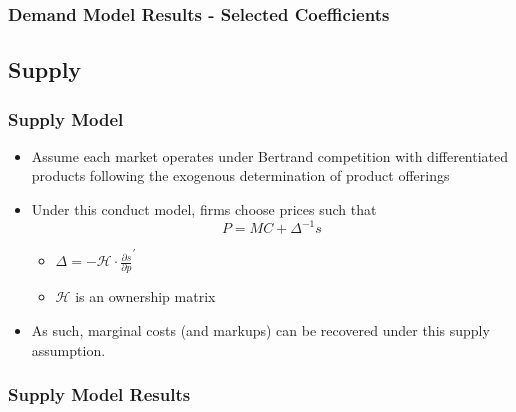 \documentclass[xcolor=dvipsnames]{beamer}
\let\Oldsubsection\subsection
\renewcommand{\subsection}{\FloatBarrier\Oldsubsection}
\begin{document}
    \begin{frame}
        \frametitle{Demand Model Results - Selected Coefficients}
        \tiny
        \centering
        \begin{adjustbox}{max height=\dimexpr\textheight-5.5cm\relax,
           max width=\textwidth}

\end{adjustbox}
    \end{frame}
    
    \subsection{Supply}
    \begin{frame}
        \frametitle{Supply Model}
        \begin{itemize}
            \item Assume each market operates under Bertrand competition with differentiated products following the exogenous determination of product offerings
            \item Under this conduct model, firms choose prices such that  \vspace{-4mm} \[P = MC + \Delta^{-1} s\]
             \vspace{-8mm}
            \begin{itemize}
                \item  $\Delta = - \mathcal{H} \cdot \frac{\partial s}{\partial p}^{'}$
                \item $\mathcal{H}$ is an ownership matrix
            \end{itemize}
            \item As such, marginal costs (and markups) can be recovered under this supply assumption. 
        \end{itemize}
    \end{frame}

    \begin{frame}
        \frametitle{Supply Model Results}
        \tiny
        \centering
        \begin{adjustbox}{max height=\dimexpr\textheight-5.5cm\relax,
           max width=\textwidth}

\end{adjustbox}
    \end{frame}
\end{document}
